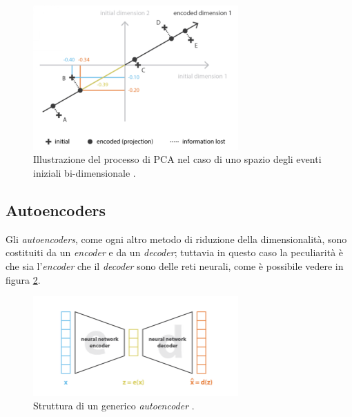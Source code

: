 \begin{figure}[h!]
	\centering
	\includegraphics[width=0.70\textwidth]{figs/PCA.png}
	\caption{Illustrazione del processo di PCA nel caso di uno spazio degli eventi iniziali bi-dimensionale \cite{Understanding_VAEs}.}
	\label{PCA}
\end{figure}

\newpage


\subsection{Autoencoders}
\label{autoencoders}

Gli \textit{autoencoders}, come ogni altro metodo di riduzione della dimensionalità, sono costituiti da un \textit{encoder} e da un \textit{decoder}; tuttavia in questo caso la peculiarità è che sia l'\textit{encoder} che il \textit{decoder} sono delle reti neurali, come è possibile vedere in figura \ref{autoencoder}. 

\begin{figure}[h!]
	\centering
	\includegraphics[width=0.70\textwidth]{figs/autoencoder.png}
	\caption{Struttura di un generico \textit{autoencoder} \cite{Understanding_VAEs}.}
	\label{autoencoder}
\end{figure}

